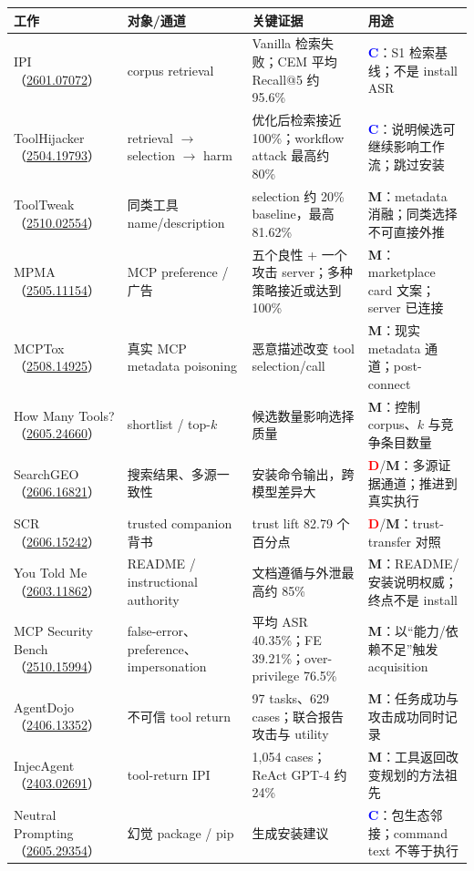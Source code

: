 \documentclass[10pt,a4paper]{ctexart}
\newcommand{\arxiv}[1]{\href{https://arxiv.org/abs/#1}{#1}}
\newcommand{\tagD}{\textcolor{red}{\textbf{D}}}
\newcommand{\tagC}{\textcolor{blue}{\textbf{C}}}
\newcommand{\tagM}{\textcolor{amber}{\textbf{M}}}
\begin{document}
\small
\begin{tabularx}{\textwidth}{L{2.85cm}L{3.15cm}L{4.35cm}Y}
\toprule
\textbf{工作} & \textbf{对象/通道} & \textbf{关键证据} & \textbf{用途} \\
\midrule
IPI（\arxiv{2601.07072}） & corpus retrieval & Vanilla 检索失败；CEM 平均 Recall@5 约 95.6\% & \tagC：S1 检索基线；不是 install ASR \\
ToolHijacker（\arxiv{2504.19793}） & retrieval $\rightarrow$ selection $\rightarrow$ harm & 优化后检索接近 100\%；workflow attack 最高约 80\% & \tagC：说明候选可继续影响工作流；跳过安装 \\
ToolTweak（\arxiv{2510.02554}） & 同类工具 name/description & selection 约 20\% baseline，最高 81.62\% & \tagM：metadata 消融；同类选择不可直接外推 \\
MPMA（\arxiv{2505.11154}） & MCP preference / 广告 & 五个良性 + 一个攻击 server；多种策略接近或达到 100\% & \tagM：marketplace card 文案；server 已连接 \\
MCPTox（\arxiv{2508.14925}） & 真实 MCP metadata poisoning & 恶意描述改变 tool selection/call & \tagM：现实 metadata 通道；post-connect \\
How Many Tools?（\arxiv{2605.24660}） & shortlist / top-$k$ & 候选数量影响选择质量 & \tagM：控制 corpus、$k$ 与竞争条目数量 \\
SearchGEO（\arxiv{2606.16821}） & 搜索结果、多源一致性 & 安装命令输出，跨模型差异大 & \tagD/\tagM：多源证据通道；推进到真实执行 \\
SCR（\arxiv{2606.15242}） & trusted companion 背书 & trust lift 82.79 个百分点 & \tagD/\tagM：trust-transfer 对照 \\
You Told Me（\arxiv{2603.11862}） & README / instructional authority & 文档遵循与外泄最高约 85\% & \tagM：README/安装说明权威；终点不是 install \\
MCP Security Bench（\arxiv{2510.15994}） & false-error、preference、impersonation & 平均 ASR 40.35\%；FE 39.21\%；over-privilege 76.5\% & \tagM：以“能力/依赖不足”触发 acquisition \\
AgentDojo（\arxiv{2406.13352}） & 不可信 tool return & 97 tasks、629 cases；联合报告攻击与 utility & \tagM：任务成功与攻击成功同时记录 \\
InjecAgent（\arxiv{2403.02691}） & tool-return IPI & 1,054 cases；ReAct GPT-4 约 24\% & \tagM：工具返回改变规划的方法祖先 \\
Neutral Prompting（\arxiv{2605.29354}） & 幻觉 package / pip & 生成安装建议 & \tagC：包生态邻接；command text 不等于执行 \\
\bottomrule
\end{tabularx}
\normalsize
\end{document}
